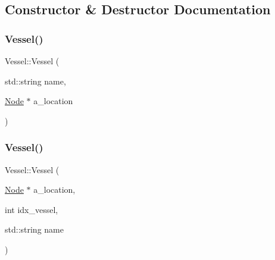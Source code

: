 \subsection{Constructor \& Destructor Documentation}
\mbox{\label{class_vessel_a209a31912f7c211e904c4d97f8895eba}} 
\subsubsection{\texorpdfstring{Vessel()}{Vessel()}\hspace{0.1cm}{\footnotesize\ttfamily [1/4]}}
{\footnotesize\ttfamily Vessel\+::\+Vessel (\begin{DoxyParamCaption}\item[{std\+::string}]{name,  }\item[{\mbox{\hyperlink{class_node}{Node}} $\ast$}]{a\+\_\+location }\end{DoxyParamCaption})}

\mbox{\label{class_vessel_a86027d1160c0c099d8766a28301b6702}} 
\subsubsection{\texorpdfstring{Vessel()}{Vessel()}\hspace{0.1cm}{\footnotesize\ttfamily [2/4]}}
{\footnotesize\ttfamily Vessel\+::\+Vessel (\begin{DoxyParamCaption}\item[{\mbox{\hyperlink{class_node}{Node}} $\ast$}]{a\+\_\+location,  }\item[{int}]{idx\+\_\+vessel,  }\item[{std\+::string}]{name }\end{DoxyParamCaption})}

\mbox{\label{class_vessel_a3310b381af95e960f57ca2a1e2b6b469}} 
